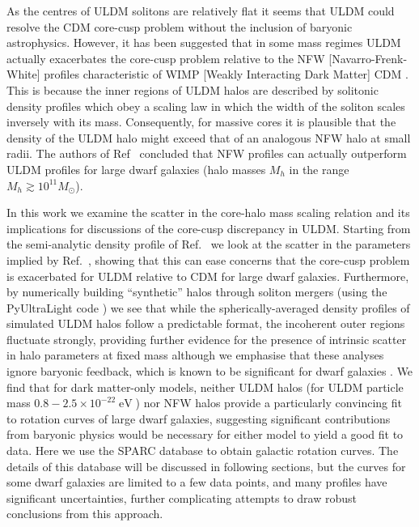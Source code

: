 \documentclass[a4paper,11pt]{article}
\begin{document}
As the  centres of ULDM solitons are relatively flat it seems that ULDM could  resolve the CDM core-cusp problem without the inclusion of baryonic astrophysics. However, it has  been suggested that in some mass regimes ULDM actually exacerbates the core-cusp problem relative to the NFW [Navarro-Frenk-White] profiles  \cite{Navarro:1995iw} characteristic of WIMP [Weakly Interacting Dark Matter] CDM \cite{Robles:2018fur}. This is because the inner regions of ULDM halos are described by solitonic density profiles which obey a scaling law in which the width of the soliton scales inversely with its mass. Consequently, for massive cores it is plausible that the density of the ULDM halo might exceed that of an analogous NFW halo at small radii. The authors of Ref~\cite{Robles:2018fur} concluded that NFW profiles can actually outperform ULDM profiles for large dwarf galaxies (halo masses $M_h$ in the range $M_h \gtrsim 10^{11} M_{\odot}$).  

In this work we examine the scatter in the core-halo mass scaling relation and its implications for discussions of the core-cusp discrepancy in ULDM. Starting from the semi-analytic density profile of Ref.~\cite{Robles:2018fur} we look at the scatter in the parameters implied by Ref.~\cite{Schive:2014hza}, showing that this can ease concerns that the core-cusp problem is  exacerbated for ULDM relative to CDM for large dwarf galaxies. Furthermore, by numerically building ``synthetic'' halos through soliton mergers (using the {\sc PyUltraLight} code \cite{Edwards:2018ccc}) we see that while the spherically-averaged density profiles of simulated ULDM halos follow a predictable format, the incoherent outer regions fluctuate strongly, providing further evidence for the presence of intrinsic scatter in halo parameters at fixed mass although we emphasise that these analyses ignore baryonic feedback, which is known to be significant for dwarf galaxies \cite{2018MNRAS.473.5698D, Benitez-Llambay:2018}. We find that for dark matter-only models, neither ULDM halos (for ULDM particle mass $0.8-2.5\times 10^{-22} \operatorname{eV}$)
nor NFW halos provide a particularly convincing fit to rotation curves of large dwarf galaxies, suggesting significant contributions from baryonic physics would be necessary for either model to yield a good fit to data. Here we use the SPARC database \cite{Lelli:2016zqa} to obtain galactic rotation curves. The details of this database will be discussed in following sections, but the curves for some dwarf galaxies are limited to a few data points, and many profiles have significant uncertainties, further complicating attempts to draw robust conclusions from this approach. 
\end{document}
